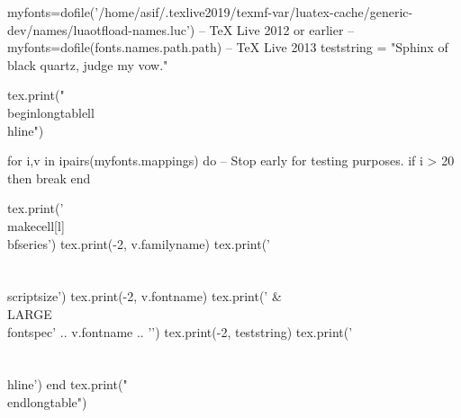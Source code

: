 \documentclass{article}
\begin{document}
\begin{luacode}
myfonts=dofile('/home/asif/.texlive2019/texmf-var/luatex-cache/generic-dev/names/luaotfload-names.luc') -- TeX Live 2012 or earlier
-- myfonts=dofile(fonts.names.path.path) -- TeX Live 2013
teststring = "Sphinx of black quartz, judge my vow."

tex.print("\\begin{longtable}{ll}\\hline")

for i,v in ipairs(myfonts.mappings) do
  -- Stop early for testing purposes.
  if i > 20 then break end

  tex.print('\\makecell[l]{\\bfseries')
  tex.print(-2, v.familyname)
  tex.print('\\\\[-1ex] \\scriptsize')
  tex.print(-2, v.fontname)
  tex.print('} & \\LARGE\\fontspec{' .. v.fontname .. '}')
  tex.print(-2, teststring)
  tex.print('\\\\ \\hline')
end
tex.print("\\end{longtable}")
\end{luacode}
\end{document}
